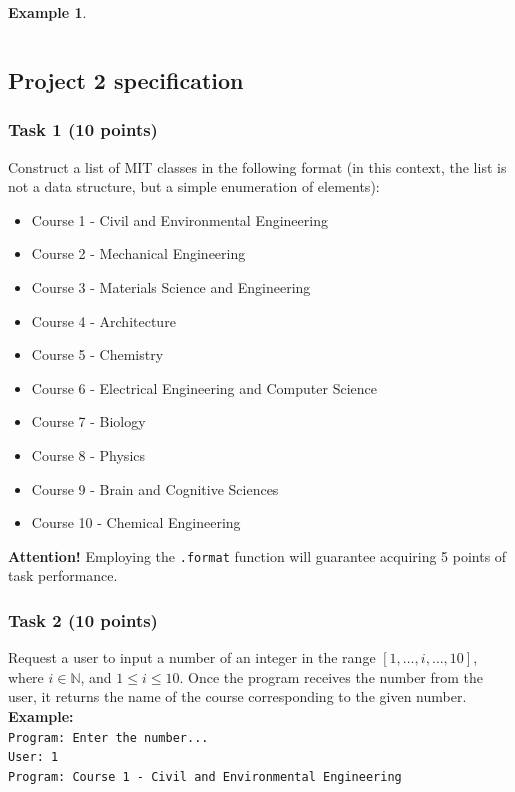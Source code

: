 \documentclass[12pt]{article}
\newtheorem{Example}{Example}[section]
\begin{document}
\begin{Example}
\begin{lstlisting}
\end{lstlisting}
\end{Example}
\newpage
\subsection{Project 2 specification}


\subsubsection{Task 1 (10 points)}
Construct a list of MIT classes in the following format (in this context, the list is not a data structure, but a simple enumeration of elements):

\begin{itemize}
\item Course 1 - Civil and Environmental Engineering
\item Course 2 - Mechanical Engineering
\item Course 3 - Materials Science and Engineering
\item Course 4 - Architecture
\item Course 5 - Chemistry
\item Course 6 - Electrical Engineering and Computer Science
\item Course 7 - Biology
\item Course 8 - Physics
\item Course 9 - Brain and Cognitive Sciences
\item Course 10 - Chemical Engineering
\end{itemize}

\textbf{Attention!} Employing the \texttt{.format} function will guarantee acquiring 5 points of task performance.

\subsubsection{Task 2 (10 points)}
Request a user to input a number of an integer in the range $[1, \dots, i, \dots, 10]$, where $i \in \mathbb{N}$, and $1 \leq i \leq 10$. Once the program receives the number from the user, it returns the name of the course corresponding to the given number. \\
\textbf{Example:} \\
\texttt{Program: Enter the number...} \\
\texttt{User:    1} \\
\texttt{Program: Course 1 - Civil and Environmental Engineering}
\end{document}
